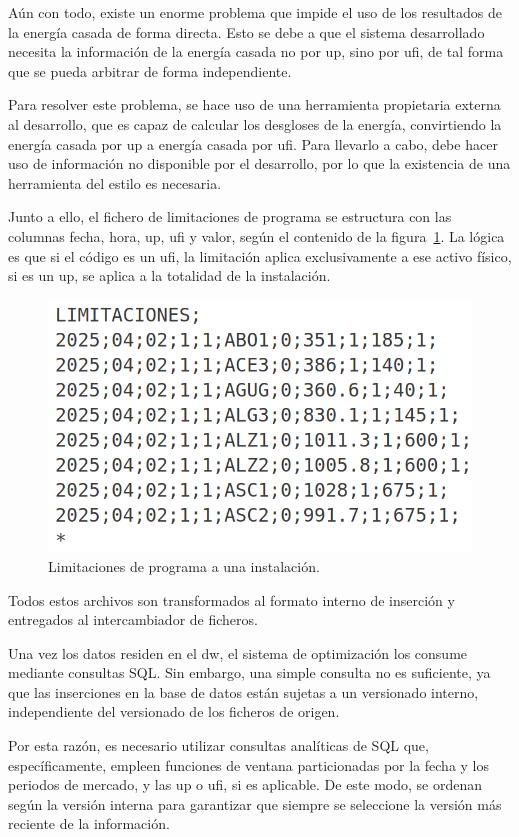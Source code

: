 Aún con todo, existe un enorme problema que impide el uso de los resultados de la energía casada de forma directa. Esto se debe a que el sistema desarrollado necesita la información de la energía casada no por \gls{up}, sino por \gls{ufi}, de tal forma que se pueda arbitrar de forma independiente.

Para resolver este problema, se hace uso de una herramienta propietaria externa al desarrollo, que es capaz de calcular los desgloses de la energía, convirtiendo la energía casada por \gls{up} a energía casada por \gls{ufi}. Para llevarlo a cabo, debe hacer uso de información no disponible por el desarrollo, por lo que la existencia de una herramienta del estilo es necesaria.

Junto a ello, el fichero de limitaciones de programa se estructura con las columnas fecha, hora, \gls{up}, \gls{ufi} y valor, según el contenido de la figura~\ref{fig:contenido-limitaciones}. La lógica es que si el código es un \gls{ufi}, la limitación aplica exclusivamente a ese activo físico, si es un \gls{up}, se aplica a la totalidad de la instalación.

\begin{figure}
  \centering
  \includegraphics[width=0.5\linewidth]{figures/contenido-limitaciones.png}
  \caption[Limitaciones de programa a una instalación.]{Limitaciones de programa a una instalación.}%
  \label{fig:contenido-limitaciones}
\end{figure}

Todos estos archivos son transformados al formato interno de inserción y entregados al intercambiador de ficheros.

Una vez los datos residen en el \gls{dw}, el sistema de optimización los consume mediante consultas SQL\@. Sin embargo, una simple consulta no es suficiente, ya que las inserciones en la base de datos están sujetas a un versionado interno, independiente del versionado de los ficheros de origen.

Por esta razón, es necesario utilizar consultas analíticas de SQL que, específicamente, empleen funciones de ventana particionadas por la fecha y los periodos de mercado, y las \gls{up} o \gls{ufi}, si es aplicable. De este modo, se ordenan según la versión interna para garantizar que siempre se seleccione la versión más reciente de la información.


